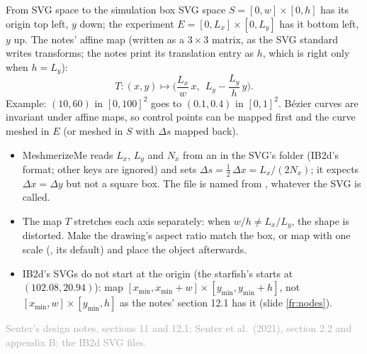 \documentclass[aspectratio=169,11pt]{beamer}
\newcommand{\sourcecredit}[1]{\vfill\hfill{\tiny\textcolor{DarkGray}{#1}}}
\begin{document}
\begin{frame}{From SVG space to the simulation box}
\label{fr:map}
\footnotesize
SVG space $S = [0, w] \times [0, h]$ has its origin top left, $y$ down; the experiment $E = [0, L_x] \times [0, L_y]$ has it bottom left, $y$ up. The notes' affine map (written as a $3 \times 3$ matrix, as the SVG standard writes transforms; the notes print its translation entry as $h$, which is right only when $h = L_y$):
\[ T: (x, y) \mapsto \Big( \frac{L_x}{w}\,x,\ \ L_y - \frac{L_y}{h}\,y \Big). \]
Example: $(10, 60)$ in $[0, 100]^2$ goes to $(0.1, 0.4)$ in $[0, 1]^2$. B\'ezier curves are invariant under affine maps, so control points can be mapped first and the curve meshed in $E$ (or meshed in $S$ with $\Delta s$ mapped back).
\begin{itemize}
  \item MeshmerizeMe reads $L_x$, $L_y$ and $N_x$ from an  in the SVG's folder (IB2d's format; other keys are ignored) and sets $\Delta s = \frac12\,\Delta x = L_x/(2N_x)$; it expects $\Delta x = \Delta y$ but not a square box. The  file is named from , whatever the SVG is called.
  \item The map $T$ stretches each axis separately: when $w/h \ne L_x/L_y$, the shape is distorted. Make the drawing's aspect ratio match the box, or map with one scale (, its default) and place the object afterwards.
  \item IB2d's SVGs do not start at the origin (the starfish's  starts at $(102.08, 20.94)$): map $[x_{\min}, x_{\min} + w] \times [y_{\min}, y_{\min} + h]$, not $[x_{\min}, w] \times [y_{\min}, h]$ as the notes' section 12.1 has it (slide \ref{fr:nodes}).
\end{itemize}
\sourcecredit{Senter's design notes, sections 11 and 12.1; Senter et al.\ (2021), section 2.2 and appendix B; the IB2d SVG files.}
\end{frame}
\end{document}
